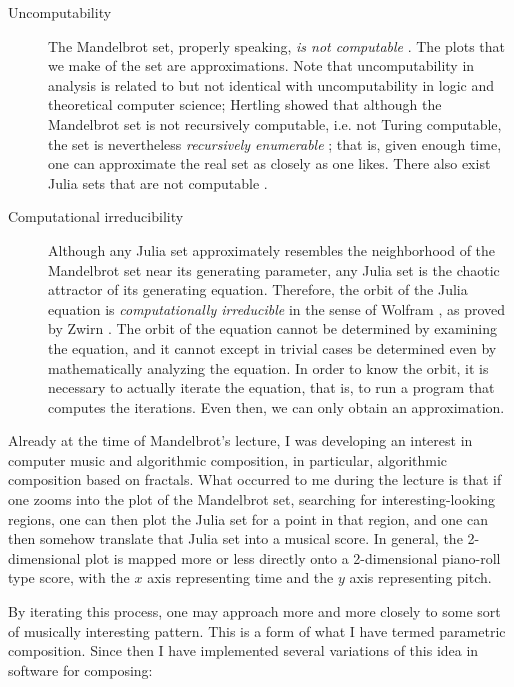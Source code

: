 \documentclass[11pt]{amsart}
\begin{document}
\begin{description}
\item[Uncomputability] The Mandelbrot set, properly speaking, \emph{is not computable} \cite{blum1993godel}. The plots that we make of the set are approximations. Note that uncomputability in analysis is related to but not identical with uncomputability in logic and theoretical computer science; Hertling showed that although the  Mandelbrot set is not recursively computable, i.e. not Turing computable, the set is nevertheless \emph{recursively enumerable} \cite{Hertling2005-HERITM-3}; that is, given enough time, one can approximate the real set as closely as one likes. There also exist Julia sets that are not computable \cite{braverman2006non, braverman2009computability}.
\item[Computational irreducibility] Although any Julia set approximately resembles the neighborhood of the Mandelbrot set near its generating parameter, any Julia set is the chaotic attractor of its generating equation. Therefore, the orbit of the Julia equation is \emph{computationally irreducible} in the sense of Wolfram \cite{wolfram1985undecidability}, as proved by Zwirn \cite{zwirn2015computational}. The orbit of the equation cannot be determined by examining the equation, and it cannot except in trivial cases be determined even by mathematically analyzing the equation. In order to know the orbit, it is necessary to actually iterate the equation, that is, to run a program that computes the iterations. Even then, we can only obtain an approximation.
\end{description}

Already at the time of Mandelbrot's lecture, I was developing an interest in computer music and algorithmic composition, in particular, algorithmic composition based on fractals. What occurred to me during the lecture is that if one zooms into the plot of the Mandelbrot set, searching for interesting-looking regions, one can then plot the Julia set for a point in that region, and one can then somehow translate that Julia set into a musical score. In general, the 2-dimensional plot is mapped more or less directly onto a 2-dimensional piano-roll type score, with the $x$ axis representing time and the $y$ axis representing pitch.

By iterating this process, one may approach more and more closely to some sort of musically interesting pattern. This is a form of what I have termed parametric composition. Since then I have implemented several variations of this idea in software for composing:
\end{document}

